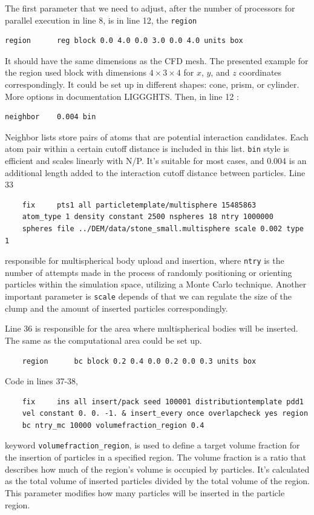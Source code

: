 The first parameter that we need to adjust, after the number of processors for parallel execution in line 8, is in line 12, the  \texttt{region}
\begin{verbatim}
region		reg block 0.0 4.0 0.0 3.0 0.0 4.0 units box
\end{verbatim}
It should have the same dimensions as the CFD mesh. The presented example for the region used block with dimensions $4 \times 3 \times 4$ for $x$, $y$, and $z$ coordinates correspondingly. It could be set up in different shapes: cone, prism, or cylinder. More options in documentation LIGGGHTS. Then, in line 12 :
\begin{verbatim}
neighbor	0.004 bin
\end{verbatim}
Neighbor lists store pairs of atoms that are potential interaction candidates. Each atom pair within a certain cutoff distance is included in this list. \texttt{bin} style is efficient and scales linearly with N/P. It's suitable for most cases, and 0.004 is an additional length added to the interaction cutoff distance between particles. Line 33 
\begin{verbatim}
    fix		pts1 all particletemplate/multisphere 15485863 
    atom_type 1 density constant 2500 nspheres 18 ntry 1000000
    spheres file ../DEM/data/stone_small.multisphere scale 0.002 type 1
\end{verbatim}
responsible for multispherical body upload and insertion, where \verb|ntry| is the number of attempts made in the process of randomly positioning or orienting particles within the simulation space, utilizing a Monte Carlo technique. Another important parameter is \verb|scale| depends of that we can regulate the size of the clump and the amount of inserted particles correspondingly. 

Line 36 is responsible for the area where multispherical bodies will be inserted. The same as the computational area could be set up.
\begin{verbatim}
    region		bc block 0.2 0.4 0.0 0.2 0.0 0.3 units box
\end{verbatim}
Code in lines 37-38,
\begin{verbatim}
    fix		ins all insert/pack seed 100001 distributiontemplate pdd1
    vel constant 0. 0. -1. & insert_every once overlapcheck yes region 
    bc ntry_mc 10000 volumefraction_region 0.4
\end{verbatim}
keyword \texttt{volumefraction\_region}, is used to define a target volume fraction for the insertion of particles in a specified region. The volume fraction is a ratio that describes how much of the region's volume is occupied by particles. It's calculated as the total volume of inserted particles divided by the total volume of the region. This parameter modifies how many particles will be inserted in the particle region.

